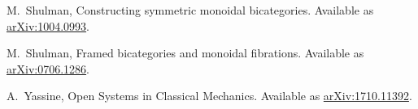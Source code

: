 \documentclass{amsart}
\begin{document}
\begin{thebibliography}{100}







 M.\ Shulman, Constructing symmetric monoidal bicategories. Available as \href{http://arxiv.org/abs/1004.0993}{arXiv:1004.0993}.

 M.\ Shulman, Framed bicategories and monoidal fibrations. Available as \href{https://arxiv.org/abs/0706.1286}{arXiv:0706.1286}.


 A.\ Yassine, Open Systems in Classical Mechanics. Available as \href{https://arxiv.org/abs/1710.11392}{arXiv:1710.11392}.

\end{thebibliography}
\end{document}
